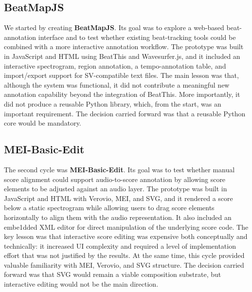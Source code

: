 \subsection{BeatMapJS}
We started by creating \textbf{BeatMapJS}. Its goal was to explore a web-based beat-annotation interface and to test whether existing beat-tracking tools could be combined with a more interactive annotation workflow. The prototype was built in JavaScript and HTML using BeatThis \cite{foscarinBeatThisAccurate2024a} and Wavesurfer.js, and it included an interactive spectrogram, region annotation, a tempo-annotation table, and import/export support for SV-compatible text files. The main lesson was that, although the system was functional, it did not contribute a meaningful new annotation capability beyond the integration of BeatThis. More importantly, it did not produce a reusable Python library, which, from the start, was an important requirement. The decision carried forward was that a reusable Python core would be mandatory.

\subsection{MEI-Basic-Edit}
The second cycle was \textbf{MEI-Basic-Edit}. Its goal was to test whether manual score alignment could support audio-to-score annotation by allowing score elements to be adjusted against an audio layer. The prototype was built in JavaScript and HTML with Verovio, MEI, and SVG, and it rendered a score below a static spectrogram while allowing users to drag score elements horizontally to align them with the audio representation. It also included an embe1dded XML editor for direct manipulation of the underlying score code. The key lesson was that interactive score editing was expensive both conceptually and technically: it increased UI complexity and required a level of implementation effort that was not justified by the results. At the same time, this cycle provided valuable familiarity with MEI, Verovio, and SVG structure. The decision carried forward was that SVG would remain a viable composition substrate, but interactive editing would not be the main direction.

